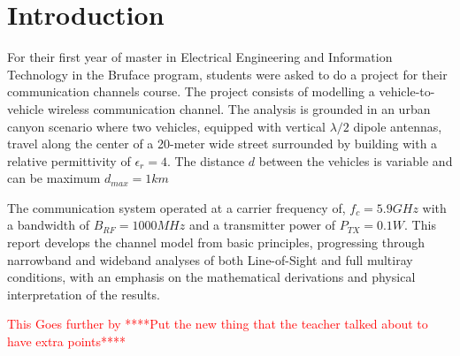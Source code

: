 \setcounter{secnumdepth}{-1}
\chapter{Introduction}
For their first year of master in Electrical Engineering and Information Technology in the Bruface program, students were asked to do a project for their communication channels course. The project consists of modelling a vehicle-to-vehicle wireless communication channel. The analysis is grounded in an urban canyon scenario where two vehicles, equipped with vertical $\lambda/2$ dipole antennas, travel along the center of a 20-meter wide street surrounded by building with a relative permittivity of $\epsilon_r=4$. The distance $d$ between the vehicles is variable and can be maximum $d_{max} = 1 km$

The communication system operated at a carrier frequency of, $f_c = 5.9 GHz$ with a bandwidth of $B_{RF} = 1000 MHz$ and a transmitter power of $P_{TX} = 0.1 W$. This report develops the channel model from basic principles, progressing through narrowband and wideband analyses of both Line-of-Sight and full multiray conditions, with an emphasis on the mathematical derivations and physical interpretation of the results.

\textcolor{red}{This Goes further by ****Put the new thing that the teacher talked about to have extra points****}
